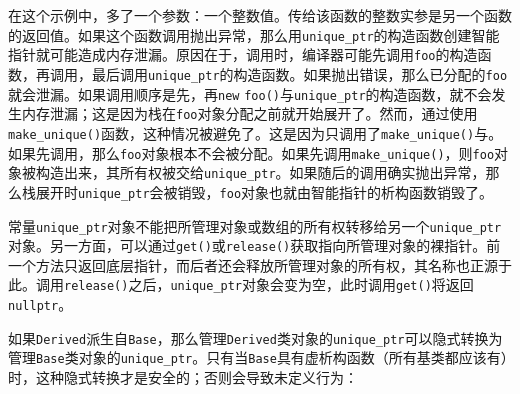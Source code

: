 
在这个示例中，多了一个参数：一个整数值。传给该函数的整数实参是另一个函数的返回值。如果这个函数调用抛出异常，那么用\texttt{unique\_\allowbreak{}ptr}的构造函数创建智能指针就可能造成内存泄漏。原因在于，调用时，编译器可能先调用\texttt{foo}的构造函数，再调用，最后调用\texttt{unique\_\allowbreak{}ptr}的构造函数。如果抛出错误，那么已分配的\texttt{foo}就会泄漏。如果调用顺序是先，再\texttt{new} \texttt{foo()}与\texttt{unique\_\allowbreak{}ptr}的构造函数，就不会发生内存泄漏；这是因为栈在\texttt{foo}对象分配之前就开始展开了。然而，通过使用\texttt{make\_\allowbreak{}unique()}函数，这种情况被避免了。这是因为只调用了\texttt{make\_\allowbreak{}unique()}与。如果先调用，那么\texttt{foo}对象根本不会被分配。如果先调用\texttt{make\_\allowbreak{}unique()}，则\texttt{foo}对象被构造出来，其所有权被交给\texttt{unique\_\allowbreak{}ptr}。如果随后的调用确实抛出异常，那么栈展开时\texttt{unique\_\allowbreak{}ptr}会被销毁，\texttt{foo}对象也就由智能指针的析构函数销毁了。



常量\texttt{unique\_\allowbreak{}ptr}对象不能把所管理对象或数组的所有权转移给另一个\texttt{unique\_\allowbreak{}ptr}对象。另一方面，可以通过\texttt{get()}或\texttt{release()}获取指向所管理对象的裸指针。前一个方法只返回底层指针，而后者还会释放所管理对象的所有权，其名称也正源于此。调用\texttt{release()}之后，\texttt{unique\_\allowbreak{}ptr}对象会变为空，此时调用\texttt{get()}将返回\texttt{nullptr}。



如果\texttt{Derived}派生自\texttt{Base}，那么管理\texttt{Derived}类对象的\texttt{unique\_\allowbreak{}ptr}可以隐式转换为管理\texttt{Base}类对象的\texttt{unique\_\allowbreak{}ptr}。只有当\texttt{Base}具有虚析构函数（所有基类都应该有）时，这种隐式转换才是安全的；否则会导致未定义行为：


